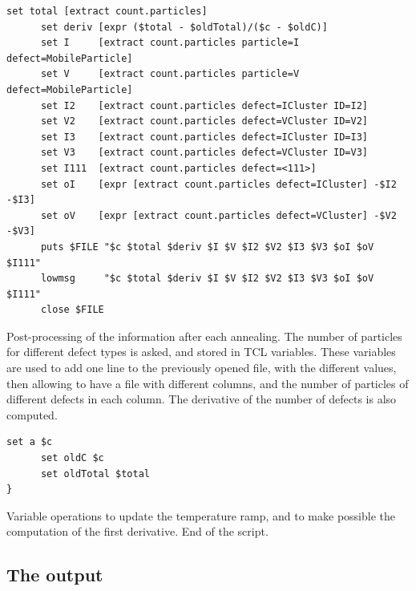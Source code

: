 \begin{lstlisting}[firstnumber=35]
      set total [extract count.particles]
      set deriv [expr ($total - $oldTotal)/($c - $oldC)]
      set I     [extract count.particles particle=I defect=MobileParticle]
      set V     [extract count.particles particle=V defect=MobileParticle]
      set I2    [extract count.particles defect=ICluster ID=I2]
      set V2    [extract count.particles defect=VCluster ID=V2]
      set I3    [extract count.particles defect=ICluster ID=I3]
      set V3    [extract count.particles defect=VCluster ID=V3]
      set I111  [extract count.particles defect=<111>]
      set oI    [expr [extract count.particles defect=ICluster] -$I2 -$I3]
      set oV    [expr [extract count.particles defect=VCluster] -$V2 -$V3]
      puts $FILE "$c $total $deriv $I $V $I2 $V2 $I3 $V3 $oI $oV $I111"
      lowmsg     "$c $total $deriv $I $V $I2 $V2 $I3 $V3 $oI $oV $I111"
      close $FILE
\end{lstlisting}
Post-processing of the information after each annealing. The number of particles for different defect types is asked, and stored in TCL variables.  These variables are used to add one line to the previously opened file, with the different values, then allowing to have a file with different columns, and the number of particles of different defects in each column. The derivative of the number of defects is also computed.

\begin{lstlisting}[firstnumber=49]
      set a $c
      set oldC $c
      set oldTotal $total
}
\end{lstlisting}
Variable operations to update the temperature ramp, and to make possible the computation of the first derivative. End of the script.

\subsection{The output}

